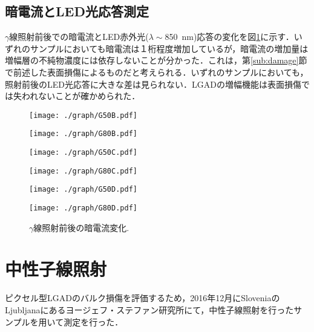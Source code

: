 \subsection{暗電流とLED光応答測定}
$\gamma$線照射前後での暗電流とLED赤外光($\lambda\sim$850~nm)応答の変化を図\ref{fig:G}に示す．いずれのサンプルにおいても暗電流は１桁程度増加しているが，暗電流の増加量は増幅層の不純物濃度には依存しないことが分かった．これは，第\ref{sub:damage}節で前述した表面損傷によるものだと考えられる．いずれのサンプルにおいても，照射前後のLED光応答に大きな差は見られない．LGADの増幅機能は表面損傷では失われないことが確かめられた．
\begin{figure}[H]
\begin{minipage}{0.5\hsize}
	\centering
	\texttt{[image: ./graph/G50B.pdf]}
\end{minipage}
\begin{minipage}{0.5\hsize}
	\centering
	\texttt{[image: ./graph/G80B.pdf]}
\end{minipage}
\begin{minipage}{0.5\hsize}
	\centering
	\texttt{[image: ./graph/G50C.pdf]}
\end{minipage}
\begin{minipage}{0.5\hsize}
	\centering
	\texttt{[image: ./graph/G80C.pdf]}
\end{minipage}
\begin{minipage}{0.5\hsize}
	\centering
	\texttt{[image: ./graph/G50D.pdf]}
\end{minipage}
\begin{minipage}{0.5\hsize}
	\centering
	\texttt{[image: ./graph/G80D.pdf]}
\end{minipage}
 	\caption{$\gamma$線照射前後の暗電流変化.}
	\label{fig:G}
\end{figure}
\newpage
\section{中性子線照射}
ピクセル型LGADのバルク損傷を評価するため，2016年12月にSloveniaのLjubljanaにあるヨージェフ・ステファン研究所にて，中性子線照射を行ったサンプルを用いて測定を行った．\par
